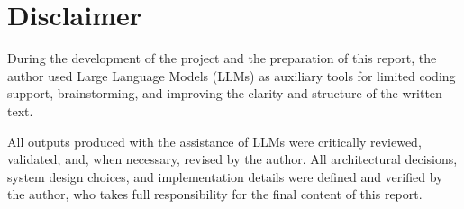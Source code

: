 \section*{Disclaimer}

During the development of the project and the preparation of this report, the author used Large Language Models (LLMs) as auxiliary tools for limited coding support, brainstorming, and improving the clarity and structure of the written text.

All outputs produced with the assistance of LLMs were critically reviewed, validated, and, when necessary, revised by the author. All architectural decisions, system design choices, and implementation details were defined and verified by the author, who takes full responsibility for the final content of this report.
\\
